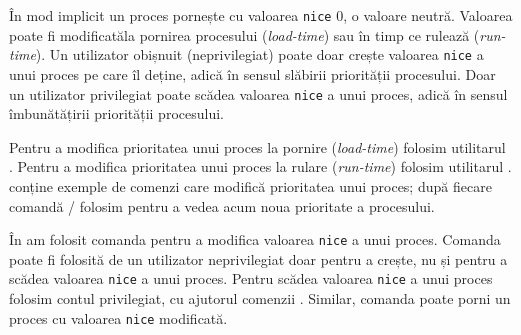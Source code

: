 În mod implicit un proces pornește cu valoarea \texttt{nice} 0, o valoare neutră.
Valoarea poate fi modificatăla pornirea procesului (\textit{load-time}) sau în timp ce
rulează (\textit{run-time}). Un utilizator obișnuit (neprivilegiat) poate doar crește
valoarea \texttt{nice} a unui proces pe care îl deține, adică în sensul slăbirii
priorității procesului. Doar un utilizator privilegiat poate scădea valoarea
\texttt{nice} a unui proces, adică în sensul îmbunătățirii priorității procesului.

Pentru a modifica prioritatea unui proces la pornire (\textit{load-time}) folosim
utilitarul . Pentru a modifica prioritatea unui proces la rulare (\textit{run-time})
folosim utilitarul .  conține exemple de comenzi care
modifică prioritatea unui proces; după fiecare comandă  /  folosim 
pentru a vedea acum noua prioritate a procesului.

În  am folosit comanda  pentru a modifica valoarea \texttt{nice} a unui proces. Comanda poate fi folosită de un utilizator neprivilegiat doar pentru a crește, nu și pentru a scădea valoarea \texttt{nice} a unui proces. Pentru scădea valoarea \texttt{nice} a unui proces folosim contul privilegiat, cu ajutorul comenzii . Similar, comanda  poate porni un proces cu valoarea \texttt{nice} modificată.


